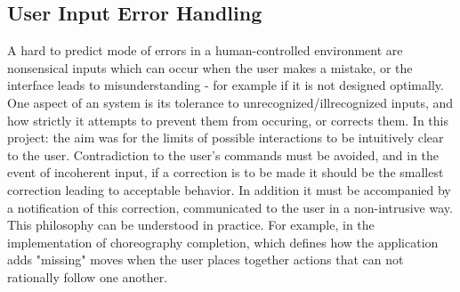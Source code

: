 \subsection{User Input Error Handling}

A hard to predict mode of errors in a human-controlled environment are nonsensical inputs which can occur when the user makes a mistake, or the interface leads to misunderstanding - for example if it is not designed optimally.\\ 

One aspect of an system is its tolerance to unrecognized/illrecognized inputs, and how strictly it attempts to prevent them from occuring, or corrects them. In this project: the aim was for the limits of possible interactions to be intuitively clear to the user. Contradiction to the user's commands must be avoided, and in the event of incoherent input, if a correction is to be made it should be the smallest correction leading to acceptable behavior. In addition it must be accompanied by a notification of this correction, communicated to the user in a non-intrusive way.\\

This philosophy can be understood in practice. For example, in the implementation of choreography completion, which defines how the application adds "missing" moves when the user places together actions that can not rationally follow one another.

